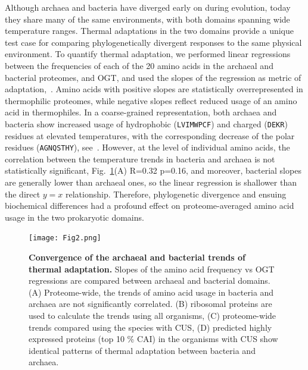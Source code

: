 \documentclass[10pt,letterpaper]{article}
\begin{document}
Although archaea and bacteria have diverged early on during evolution, today they share many of the same environments, with both domains spanning wide temperature ranges. Thermal adaptations in the two domains provide a unique test case for comparing phylogenetically divergent responses to the same physical environment. To quantify thermal adaptation, we performed linear regressions between the frequencies of each of the 20 amino acids in the archaeal and bacterial proteomes, and OGT, and used the slopes of the regression as metric of adaptation,~. Amino acids with positive slopes are statistically overrepresented in thermophilic proteomes, while negative slopes reflect reduced usage of an amino acid in thermophiles. In a coarse-grained representation, both archaea and bacteria show increased usage of hydrophobic (\texttt{LVIMWPCF}) and charged (\texttt{DEKR}) residues at elevated temperatures, with the corresponding decrease of the polar residues (\texttt{AGNQSTHY}), see~. However, at the level of individual amino acids, the correlation between the temperature trends in bacteria and archaea is not statistically significant, Fig.~\ref{fig:fig2}(A) R=0.32 p=0.16, and moreover, bacterial slopes are generally lower than archaeal ones, so the linear regression is shallower than the direct $y=x$ relationship. Therefore, phylogenetic divergence and ensuing biochemical differences had a profound effect on proteome-averaged amino acid usage in the two prokaryotic domains. 

\begin{figure}[h!]
\texttt{[image: Fig2.png]}
\caption{
{\bf Convergence of the archaeal and bacterial trends of thermal adaptation.} Slopes of the amino acid frequency vs OGT regressions are compared between archaeal and bacterial domains.
(A) Proteome-wide, the trends of amino acid usage in bacteria and archaea are not significantly correlated.
(B) ribosomal proteins are used to calculate the trends using all organisms,
(C) proteome-wide trends compared using the species with CUS,
(D) predicted highly expressed proteins (top 10 \% CAI) in the organisms with CUS show identical patterns of thermal adaptation between bacteria and archaea.
}
\label{fig:fig2}
\end{figure}
\end{document}
